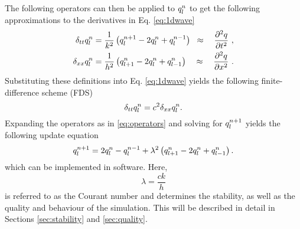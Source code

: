 The following operators can then be applied to $q_l^n$ to get the following approximations to the derivatives in Eq. \eqref{eq:1dwave}
\begin{subequations}\label{eq:operators}
    \begin{align}
         \delta_{tt}q_l^n &= \frac{1}{k^2}\left(q_l^{n+1}-2q_l^n + q_l^{n-1}\right)\;\;\approx\quad\frac{\partial^2q}{\partial t^2}\label{eq:secondOrderTime}\ ,\\
         \delta_{xx}q_l^n &= \frac{1}{h^2}\left(q_{l+1}^n-2q_l^n + q_{l-1}^n\right)\quad\approx\quad \frac{\partial^2q}{\partial x^2}\ .\label{eq:secondOrderSpace}
    \end{align}
\end{subequations}
Substituting these definitions into Eq. \eqref{eq:1dwave} yields the following finite-difference scheme (FDS)
\begin{equation}\label{eq:FDS}
    \delta_{tt}q_l^n = c^2 \delta_{xx}q_l^n.
\end{equation}
Expanding the operators as in %
\eqref{eq:operators} and solving for $q_l^{n+1}$ yields the following update equation
\begin{equation}\label{eq:updateEq}
    q_l^{n+1} = 2q_l^n-q_l^{n-1} + \lambda^2 \left(q_{l+1}^n-2q_l^n + q_{l-1}^n\right).
\end{equation}
which can be implemented in software. %
Here,
\begin{equation}\label{eq:lambdaDef}
    \lambda = \frac{ck}{h}
\end{equation}
is referred to as the Courant number and determines the stability, as well as the quality and behaviour of the simulation. This will be described in detail in Sections \ref{sec:stability} and \ref{sec:quality}.

